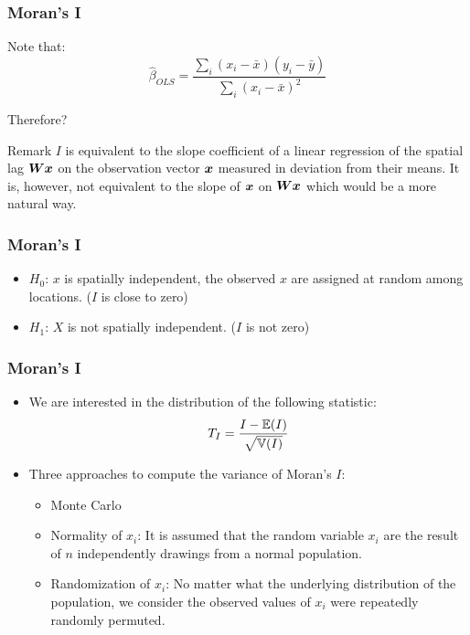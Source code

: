 \documentclass[english,10pt]{beamer}\usepackage[]{graphicx}\usepackage[]{xcolor}
\begin{document}
\begin{frame}
  \frametitle{Moran's I}
    Note that:
        \begin{equation*}
          \widehat{\beta}_{OLS} = \frac{\sum_i(x_i -\bar{x})(y_i - \bar{y})}{\sum_i(x_i - \bar{x})^2}
        \end{equation*}
        
        \alert{Therefore?}
        
        \pause
        \begin{alertblock}{Remark}
        $I$ is equivalent to the slope coefficient of a linear regression of the spatial lag $\bm W\bm x$ on the observation vector $\bm x$ measured in deviation from their means. It is, however, not equivalent to the slope of $\bm x$ on $\bm W\bm x$ which would be a more natural way.
        \end{alertblock}
\end{frame}

\begin{frame}
  \frametitle{Moran's I}
    \begin{itemize}
      \item $H_0$: $x$ is spatially independent, the observed $x$ are assigned at random among locations. ($I$ is close to zero)
      \item $H_1$: $X$ is not spatially independent. ($I$ is not zero)
    \end{itemize}
\end{frame}

\begin{frame}
  \frametitle{Moran's I}
    \begin{itemize}
      \item We are interested in the distribution of the following statistic:
            \begin{equation}
              T_I = \frac{I - \mathbb{E}(I)}{\sqrt{\mathbb{V}(I)}}
            \end{equation}
      \item Three approaches to compute the variance of Moran's $I$:
        \begin{itemize}
          \item Monte Carlo
          \item Normality of $x_i$: It is assumed that the random variable $x_i$ are the result of $n$ independently drawings from a normal population.
          \item Randomization of $x_i$: No matter what the underlying distribution of the population, we consider the observed values of $x_i$ were repeatedly randomly permuted.
        \end{itemize}
    \end{itemize}
\end{frame}
\end{document}
